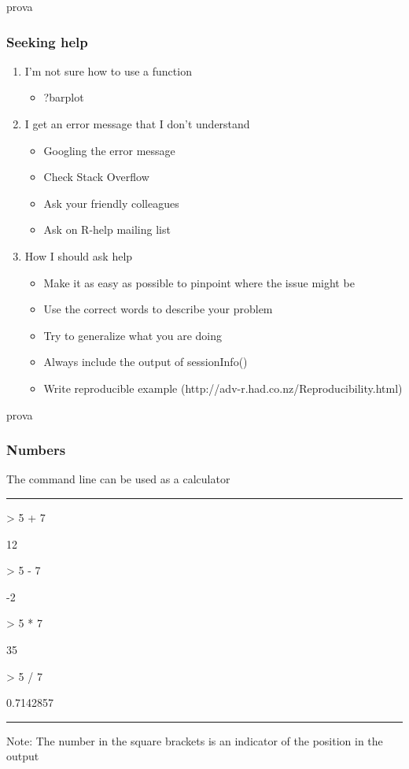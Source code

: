 \documentclass{beamer}
\begin{document}
\begin{frame}[fragile]{prova}
	\frametitle{Seeking help}
	\begin{enumerate}
		\item I'm not sure how to use a function
			\begin{itemize}
				\item \small ?barplot
			\end{itemize}
\pause
		\item I get an error message that I don't understand
			\begin{itemize}
				\item \small Googling the error message
				\item \small Check Stack Overflow
				\item \small Ask your friendly colleagues
				\item \small Ask on R-help mailing list
			\end{itemize}
\pause
		\item How I should ask help
			\begin{itemize}
				\item \small Make it as easy as possible to pinpoint where the issue might be
				\item \small Use the correct words to describe your problem
				\item \small Try to generalize what you are doing
				\item \small Always include the output of sessionInfo()
				\item \small Write reproducible example (http://adv-r.had.co.nz/Reproducibility.html)
			\end{itemize}
	\end{enumerate}
\end{frame}


\begin{frame}[fragile]{prova}
	\frametitle{Numbers}
	The command line can be used as a calculator
\rule{\textwidth}{0.4pt}
\begin{Schunk}
\begin{Sinput}
> 5 + 7 
\end{Sinput}
\begin{Soutput}
[1] 12
\end{Soutput}
\begin{Sinput}
> 5 - 7
\end{Sinput}
\begin{Soutput}
[1] -2
\end{Soutput}
\begin{Sinput}
> 5 * 7
\end{Sinput}
\begin{Soutput}
[1] 35
\end{Soutput}
\begin{Sinput}
> 5 / 7
\end{Sinput}
\begin{Soutput}
[1] 0.7142857
\end{Soutput}
\end{Schunk}
\rule{\textwidth}{0.4pt}
\vspace{5pt}
\small Note: The number in the square brackets is an indicator of the position in the output
\end{frame}
\end{document}

